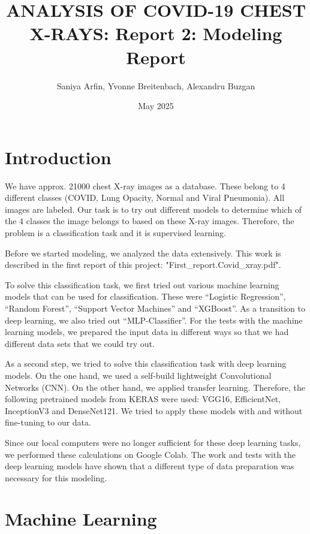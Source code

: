 \documentclass{article}
\title{ANALYSIS OF COVID-19 CHEST X-RAYS: Report 2: Modeling Report}
\author{Saniya Arfin, Yvonne Breitenbach, Alexandru Buzgan}
\date{May 2025}
\begin{document}
\maketitle

\tableofcontents

\newpage 

\section{Introduction}

We have approx. 21000 chest X-ray images as a database. These belong to 4 different classes (COVID, Lung Opacity, Normal and Viral Pneumonia). All images are labeled. Our task is to try out different models to determine which of the 4 classes the image belongs to based on these X-ray images. Therefore, the problem is a classification task and it is supervised learning. 

Before we started modeling, we analyzed the data extensively. This work is described in the first report of this project: "First\_report.Covid\_xray.pdf".

To solve this classification task, we first tried out various machine learning models that can be used for classification. 
These were “Logistic Regression”, “Random Forest”, “Support Vector Machines” and “XGBoost”. As a transition to deep learning, we also tried out “MLP-Classifier”. 
For the tests with the machine learning models, we prepared the input data in different ways so that we had different data sets that we could try out.

As a second step, we tried to solve this classification task with deep learning models. On the one hand, we used a self-build lightweight Convolutional Networks (CNN). On the other hand, we applied transfer learning. Therefore, the following pretrained models from KERAS were used: VGG16, EfficientNet, InceptionV3 and DenseNet121. We tried to apply these models with and without fine-tuning to our data. 

Since our local computers were no longer sufficient for these deep learning tasks, we performed these calculations on Google Colab. The work and tests with the deep learning models have shown that a different type of data preparation was necessary for this modeling. 

\section{Machine Learning}
\end{document}
